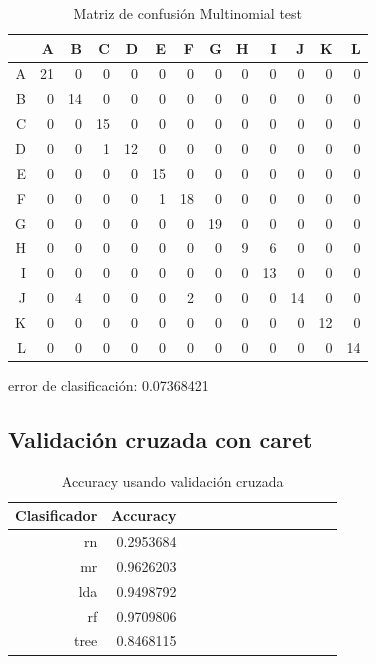 \documentclass[pdf]{beamer}
\begin{document}
\begin{frame}
\begin{table}[ht]
\begin{adjustbox}{width= 3.5in,center}
\centering
\begin{tabular}{rrrrrrrrrrrrr}
  \hline
 & A & B & C & D & E & F & G & H & I & J & K & L \\ 
  \hline
A &  21 &   0 &   0 &   0 &   0 &   0 &   0 &   0 &   0 &   0 &   0 &   0 \\ 
  B &   0 &  14 &   0 &   0 &   0 &   0 &   0 &   0 &   0 &   0 &   0 &   0 \\ 
  C &   0 &   0 &  15 &   0 &   0 &   0 &   0 &   0 &   0 &   0 &   0 &   0 \\ 
  D &   0 &   0 &   1 &  12 &   0 &   0 &   0 &   0 &   0 &   0 &   0 &   0 \\ 
  E &   0 &   0 &   0 &   0 &  15 &   0 &   0 &   0 &   0 &   0 &   0 &   0 \\ 
  F &   0 &   0 &   0 &   0 &   1 &  18 &   0 &   0 &   0 &   0 &   0 &   0 \\ 
  G &   0 &   0 &   0 &   0 &   0 &   0 &  19 &   0 &   0 &   0 &   0 &   0 \\ 
  H &   0 &   0 &   0 &   0 &   0 &   0 &   0 &   9 &   6 &   0 &   0 &   0 \\ 
  I &   0 &   0 &   0 &   0 &   0 &   0 &   0 &   0 &  13 &   0 &   0 &   0 \\ 
  J &   0 &   4 &   0 &   0 &   0 &   2 &   0 &   0 &   0 &  14 &   0 &   0 \\ 
  K &   0 &   0 &   0 &   0 &   0 &   0 &   0 &   0 &   0 &   0 &  12 &   0 \\ 
  L &   0 &   0 &   0 &   0 &   0 &   0 &   0 &   0 &   0 &   0 &   0 &  14 \\ 
   \hline
\end{tabular}
\end{adjustbox}
	\label{tabla:confusionMLtest}
	\caption{Matriz de confusión Multinomial test}
\end{table}

error de clasificación: 0.07368421
\end{frame}

\subsection{Validación cruzada con caret}

\begin{frame}
\begin{table}[ht]
\centering
\begin{tabular}{rrrrrrrrrrrrr}
  \hline
Clasificador & Accuracy\\ 
  \hline
rn &   0.2953684  \\ 
mr &   0.9626203  \\ 
lda &   0.9498792 \\ 
rf &   0.9709806 \\ 
tree &   0.8468115\\ 
   \hline
\end{tabular}
	\label{tabla:AccuracyCV}
	\caption{Accuracy usando validación cruzada}
\end{table}
\end{frame}
\end{document}
